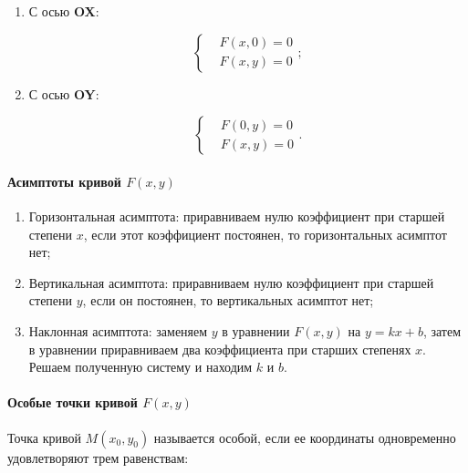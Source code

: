 				\begin{enumerate}
					\item С осью \textbf{OX}:

						\begin{equation}
							\begin{cases}
								& F \left( x, 0 \right) = 0\\
								& F \left( x, y \right) = 0
							\end{cases};
						\end{equation}

					\item С осью \textbf{OY}:

						\begin{equation}
							\begin{cases}
								& F \left( 0, y \right) = 0\\
								& F \left( x, y \right) = 0
							\end{cases}.
						\end{equation}

				\end{enumerate}

			\paragraph{Асимптоты кривой $F \left( x, y \right)$}

				\begin{enumerate}
					\item Горизонтальная асимптота: приравниваем нулю коэффициент при старшей степени $x$, если этот коэффициент постоянен, то горизонтальных асимптот нет;
					
					\item Вертикальная асимптота: приравниваем нулю коэффициент при старшей степени $y$, если он постоянен, то вертикальных асимптот нет;
					
					\item Наклонная асимптота: заменяем $y$ в уравнении $F \left( x, y \right)$ на $y = k x + b$, затем в уравнении  приравниваем два коэффициента при старших степенях $x$. Решаем полученную систему и находим $k$ и $b$.
				\end{enumerate}

			\paragraph{Особые точки кривой $F \left( x, y \right)$}

				Точка  кривой $M \left( x_{0}, y_{0} \right)$ называется особой, если ее координаты одновременно удовлетворяют трем равенствам:

